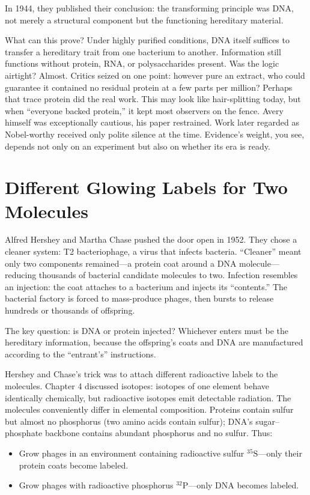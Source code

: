 In 1944, they published their conclusion: the transforming principle was DNA, not merely a structural component but the functioning hereditary material.

What can this prove? Under highly purified conditions, DNA itself suffices to transfer a hereditary trait from one bacterium to another. Information still functions without protein, RNA, or polysaccharides present. Was the logic airtight? Almost. Critics seized on one point: however pure an extract, who could guarantee it contained no residual protein at a few parts per million? Perhaps that trace protein did the real work. This may look like hair-splitting today, but when ``everyone backed protein,'' it kept most observers on the fence. Avery himself was exceptionally cautious, his paper restrained. Work later regarded as Nobel-worthy received only polite silence at the time. Evidence's weight, you see, depends not only on an experiment but also on whether its era is ready.

\section{Different Glowing Labels for Two Molecules}

Alfred Hershey and Martha Chase pushed the door open in 1952. They chose a cleaner system: T2 bacteriophage, a virus that infects bacteria. ``Cleaner'' meant only two components remained---a protein coat around a DNA molecule---reducing thousands of bacterial candidate molecules to two. Infection resembles an injection: the coat attaches to a bacterium and injects its ``contents.'' The bacterial factory is forced to mass-produce phages, then bursts to release hundreds or thousands of offspring.

The key question: is DNA or protein injected? Whichever enters must be the hereditary information, because the offspring's coats and DNA are manufactured according to the ``entrant's'' instructions.

Hershey and Chase's trick was to attach different radioactive labels to the molecules. Chapter 4 discussed isotopes: isotopes of one element behave identically chemically, but radioactive isotopes emit detectable radiation. The molecules conveniently differ in elemental composition. Proteins contain sulfur but almost no phosphorus (two amino acids contain sulfur); DNA's sugar--phosphate backbone contains abundant phosphorus and no sulfur. Thus:

\begin{itemize}[itemsep=2pt]
\item Grow phages in an environment containing radioactive sulfur $^{35}\mathrm{S}$---only their protein coats become labeled.
\item Grow phages with radioactive phosphorus $^{32}\mathrm{P}$---only DNA becomes labeled.
\end{itemize}

